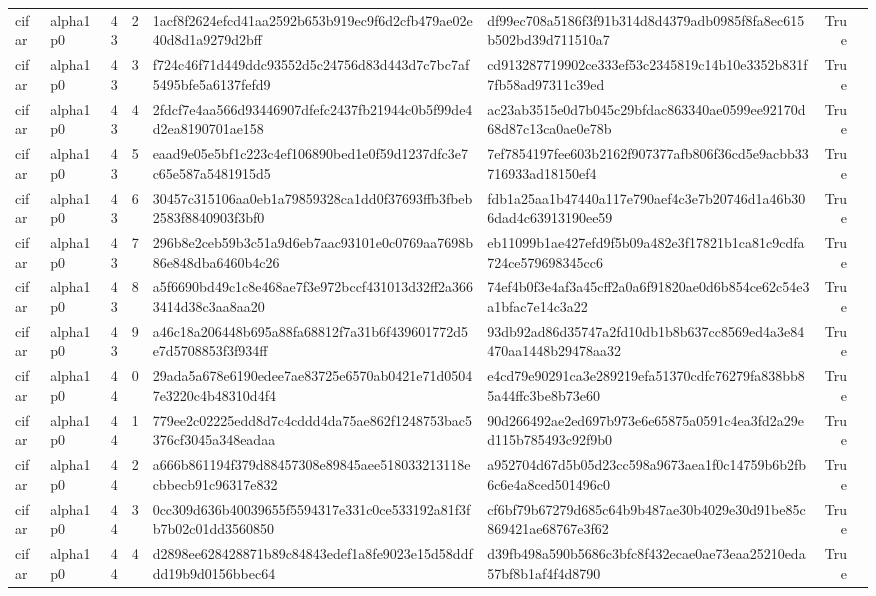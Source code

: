 \begin{tabular}{llrrllrl}
cifar & alpha1p0 & 43 & 2 & 1acf8f2624efcd41aa2592b653b919ec9f6d2cfb479ae02e40d8d1a9279d2bff & df99ec708a5186f3f91b314d8d4379adb0985f8fa8ec615b502bd39d711510a7 & True &  \\
cifar & alpha1p0 & 43 & 3 & f724c46f71d449ddc93552d5c24756d83d443d7c7bc7af5495bfe5a6137fefd9 & cd913287719902ce333ef53c2345819c14b10e3352b831f7fb58ad97311c39ed & True &  \\
cifar & alpha1p0 & 43 & 4 & 2fdcf7e4aa566d93446907dfefc2437fb21944c0b5f99de4d2ea8190701ae158 & ac23ab3515e0d7b045c29bfdac863340ae0599ee92170d68d87c13ca0ae0e78b & True &  \\
cifar & alpha1p0 & 43 & 5 & eaad9e05e5bf1c223c4ef106890bed1e0f59d1237dfc3e7c65e587a5481915d5 & 7ef7854197fee603b2162f907377afb806f36cd5e9acbb33716933ad18150ef4 & True &  \\
cifar & alpha1p0 & 43 & 6 & 30457c315106aa0eb1a79859328ca1dd0f37693ffb3fbeb2583f8840903f3bf0 & fdb1a25aa1b47440a117e790aef4c3e7b20746d1a46b306dad4c63913190ee59 & True &  \\
cifar & alpha1p0 & 43 & 7 & 296b8e2ceb59b3c51a9d6eb7aac93101e0c0769aa7698b86e848dba6460b4c26 & eb11099b1ae427efd9f5b09a482e3f17821b1ca81c9cdfa724ce579698345cc6 & True &  \\
cifar & alpha1p0 & 43 & 8 & a5f6690bd49c1c8e468ae7f3e972bccf431013d32ff2a3663414d38c3aa8aa20 & 74ef4b0f3e4af3a45cff2a0a6f91820ae0d6b854ce62c54e3a1bfac7e14c3a22 & True &  \\
cifar & alpha1p0 & 43 & 9 & a46c18a206448b695a88fa68812f7a31b6f439601772d5e7d5708853f3f934ff & 93db92ad86d35747a2fd10db1b8b637cc8569ed4a3e84470aa1448b29478aa32 & True &  \\
cifar & alpha1p0 & 44 & 0 & 29ada5a678e6190edee7ae83725e6570ab0421e71d05047e3220c4b48310d4f4 & e4cd79e90291ca3e289219efa51370cdfc76279fa838bb85a44ffc3be8b73e60 & True &  \\
cifar & alpha1p0 & 44 & 1 & 779ee2c02225edd8d7c4cddd4da75ae862f1248753bac5376cf3045a348eadaa & 90d266492ae2ed697b973e6e65875a0591c4ea3fd2a29ed115b785493c92f9b0 & True &  \\
cifar & alpha1p0 & 44 & 2 & a666b861194f379d88457308e89845aee518033213118ecbbecb91c96317e832 & a952704d67d5b05d23cc598a9673aea1f0c14759b6b2fb6c6e4a8ced501496c0 & True &  \\
cifar & alpha1p0 & 44 & 3 & 0cc309d636b40039655f5594317e331c0ce533192a81f3fb7b02c01dd3560850 & cf6bf79b67279d685c64b9b487ae30b4029e30d91be85c869421ae68767e3f62 & True &  \\
cifar & alpha1p0 & 44 & 4 & d2898ee628428871b89c84843edef1a8fe9023e15d58ddfdd19b9d0156bbec64 & d39fb498a590b5686c3bfc8f432ecae0ae73eaa25210eda57bf8b1af4f4d8790 & True &  \\

\end{tabular}
